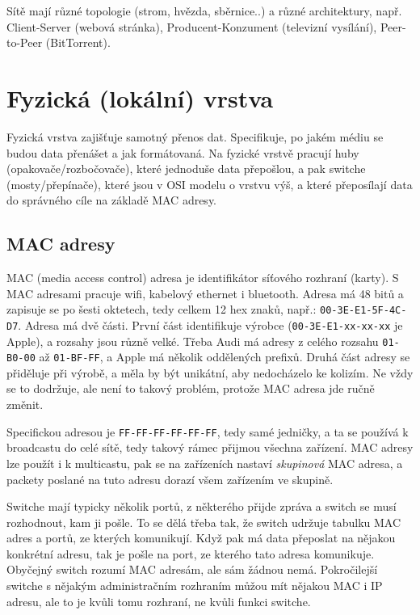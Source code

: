 Sítě mají různé topologie (strom, hvězda, sběrnice..) a různé architektury, např. Client-Server (webová stránka), Producent-Konzument (televizní vysílání), Peer-to-Peer (BitTorrent).



\section{Fyzická (lokální) vrstva}

Fyzická vrstva zajišťuje samotný přenos dat. Specifikuje, po jakém médiu se budou data přenášet a jak formátovaná. Na fyzické vrstvě pracují huby (opakovače/rozbočovače), které jednoduše data přepošlou, a pak switche (mosty/přepínače), které jsou v OSI modelu o vrstvu výš, a které přeposílají data do správného cíle na základě MAC adresy.

\subsection{MAC adresy}
MAC (media access control) adresa je identifikátor síťového rozhraní (karty). S MAC adresami pracuje wifi, kabelový ethernet i bluetooth. Adresa má 48 bitů a zapisuje se po šesti oktetech, tedy celkem 12 hex znaků, např.: \texttt{00-3E-E1-5F-4C-D7}. Adresa má dvě části. První část identifikuje výrobce (\texttt{00-3E-E1-xx-xx-xx} je Apple), a rozsahy jsou různě velké. Třeba Audi má adresy z celého rozsahu \texttt{01-B0-00} až \texttt{01-BF-FF}, a Apple má několik oddělených prefixů. Druhá část adresy se přiděluje při výrobě, a měla by být unikátní, aby nedocházelo ke kolizím. Ne vždy se to dodržuje, ale není to takový problém, protože MAC adresa jde ručně změnit.

Specifickou adresou je \texttt{FF-FF-FF-FF-FF-FF}, tedy samé jedničky, a ta se používá k broadcastu do celé sítě, tedy takový rámec přijmou všechna zařízení. MAC adresy lze použít i k multicastu, pak se na zařízeních nastaví \textit{skupinová} MAC adresa, a packety poslané na tuto adresu dorazí všem zařízením ve skupině.

Switche mají typicky několik portů, z některého přijde zpráva a switch se musí rozhodnout, kam ji pošle. To se dělá třeba tak, že switch udržuje tabulku MAC adres a portů, ze kterých komunikují. Když pak má data přeposlat na nějakou konkrétní adresu, tak je pošle na port, ze kterého tato adresa komunikuje. Obyčejný switch rozumí MAC adresám, ale sám žádnou nemá. Pokročilejší switche s nějakým administračním rozhraním můžou mít nějakou MAC i IP adresu, ale to je kvůli tomu rozhraní, ne kvůli funkci switche.

